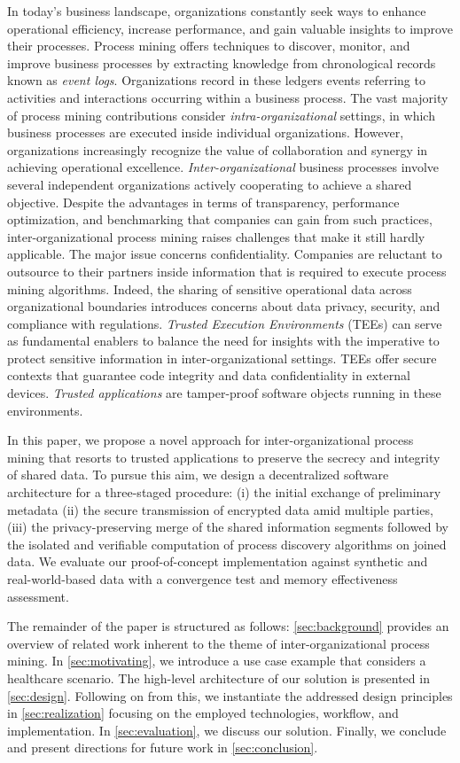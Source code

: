 In today's business landscape, organizations constantly seek ways to enhance operational efficiency, increase performance, and gain valuable insights to improve their processes. Process mining offers techniques to discover, monitor, and improve business processes by extracting knowledge from chronological records known as \textit{event logs}. Organizations record in these ledgers events referring to activities and interactions occurring within a business process. The vast majority of process mining contributions consider \textit{intra-organizational} settings, in which business processes are executed inside individual organizations. However, organizations increasingly recognize the value of collaboration and synergy in achieving operational excellence. \textit{Inter-organizational} business processes involve several independent organizations actively cooperating to achieve a shared objective. Despite the advantages in terms of transparency, performance optimization, and benchmarking that companies can gain from such practices, inter-organizational process mining raises challenges that make it still hardly applicable. The major issue concerns confidentiality. Companies are reluctant to outsource to their partners inside information that is required to execute process mining algorithms. Indeed, the sharing of sensitive operational data across organizational boundaries introduces concerns about data privacy, security, and compliance with regulations. \textit{Trusted Execution Environments} (TEEs) can serve as fundamental enablers to balance the need for insights with the imperative to protect sensitive information in inter-organizational settings. TEEs offer secure contexts that guarantee code integrity and data confidentiality in external devices. \textit{Trusted applications} are tamper-proof software objects running in these environments. 

In this paper, we propose a novel approach for inter-organizational process mining that resorts to trusted applications to preserve the secrecy and integrity of shared data. To pursue this aim, we design a decentralized software architecture for a three-staged procedure: (i) the initial exchange of preliminary metadata (ii) the secure transmission of encrypted data amid multiple parties, (iii) the privacy-preserving merge of the shared information segments followed by the isolated and verifiable computation of process discovery algorithms on joined data.
We evaluate our proof-of-concept implementation against synthetic and real-world-based data with a convergence test and memory effectiveness assessment.

The remainder of the paper is structured as follows: \cref{sec:background} provides an overview of related work inherent to the theme of inter-organizational process mining. In \cref{sec:motivating}, we introduce a use case example that considers a healthcare scenario. The high-level architecture of our solution is presented in \cref{sec:design}. Following on from this, we instantiate the addressed design principles in \cref{sec:realization} focusing on the employed technologies, workflow, and implementation. In \cref{sec:evaluation}, we discuss our solution. Finally, we conclude and present directions for future work in \cref{sec:conclusion}.
